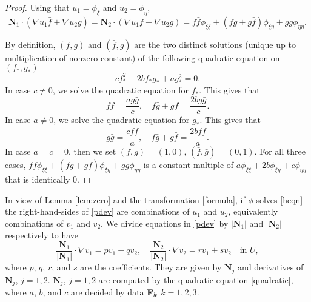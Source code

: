 \documentclass[11pt]{amsart}
\theoremstyle{plain}
\theoremstyle{remark}
\numberwithin{equation}{section}
\numberwithin{Thm}{section}
\def\N{{\mathbf N}}
\def\F{{\bf F}}
\begin{document}
\begin{proof}
Using that $u_1 = \phi_\xi$ and $u_2=\phi_\eta$,
 $$\N_1 \cdot (\nabla u_1 \bar{f} + \nabla u_2 \bar{g}) = \N_2 \cdot (\nabla u_1 {f} + \nabla u_2 {g})=  {f}\bar{f} \phi_{\xi\xi} + ({f}\bar{g} + {g} \bar{f}) \phi_{\xi\eta} + {g}\bar{g} \phi_{\eta\eta}.$$
 
 By definition,  $({f},{g})$ and $(\bar{f},\bar{g})$ are the two distinct solutions (unique up to multiplication of nonzero constant) of the following quadratic equation on $({f}_*,{g}_*)$
 \begin{equation} \label{quadratic}
 c{f}_*^2  - 2b{f}_*{g}_* + a{g}_*^2   = 0.
 \end{equation}
 In case $c\ne0$, we solve the quadratic equation for ${f}_*$. This gives that 
 $${f}\bar{f} =  \frac{a{g}\bar{g}}{c}, \quad  {f}\bar{g} + {g} \bar{f} =  \frac{2b{g}\bar{g}}{c}.$$
  In case $a\ne0$, we solve the quadratic equation for ${g}_*$. This gives that 
 $${g}\bar{g} =  \frac{c{f}\bar{f}}{a}, \quad  {f}\bar{g} + {g} \bar{f} =  \frac{2b{f}\bar{f}}{a}.$$
 In case $a=c=0$, then we set $({f},{g})=(1,0)$, $(\bar{f},\bar{g}) = (0,1)$. 
 For all three cases, ${f}\bar{f} \phi_{\xi\xi} + ({f}\bar{g} + {g} \bar{f}) \phi_{\xi\eta} + {g}\bar{g} \phi_{\eta\eta}$ is a constant multiple of $a\phi_{\xi\xi} + 2b\phi_{\xi\eta} + c\phi_{\eta\eta}$ that is identically $0$.
\end{proof}
In view of Lemma \ref{lem:zero} and the transformation \eqref{formula}, if $\phi$ solves \eqref{heqn} the right-hand-sides of \eqref{pdev} are combinations of $u_1$ and $u_2$, equivalently combinations of $v_1$ and $v_2$. We divide equations in \eqref{pdev} by $|\N_1|$ and $|\N_2|$ respectively to have
\begin{equation} \label{heqn3} \frac{\N_1}{|\N_1|}\cdot\nabla v_1 = pv_1 + qv_2, \quad \frac{\N_2}{|\N_2|}\cdot\nabla v_2 = rv_1 + sv_2 \quad \text{in $U$},
\end{equation}
where $p$, $q$, $r$, and $s$ are the coefficients. They are given by $\N_j$ and derivatives of $\N_j$, $j=1,2$. $\N_j$, $j=1,2$ are computed by the quadratic equation \eqref{quadratic}, where $a$, $b$, and $c$ are decided by data $\F_k$ $k=1,2,3$. 
\end{document}
